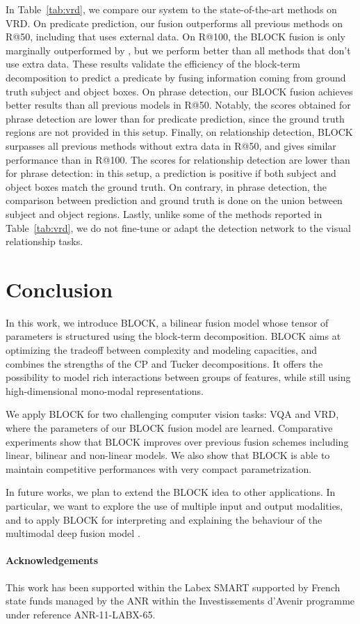 \documentclass[letterpaper]{article} \usepackage{aaai19}  \usepackage{times}  \usepackage{helvet}  \usepackage{courier}  \usepackage{url}  \usepackage{graphicx}  \usepackage{booktabs}       \usepackage{comment}
\begin{document}
In Table~\ref{tab:vrd}, we compare our system to the state-of-the-art methods on VRD. 
On predicate prediction, our fusion outperforms all previous methods on R@50, including \cite{Yu_2017_ICCV} that uses external data. On R@100, the BLOCK fusion is only marginally outperformed by \cite{Yu_2017_ICCV}, but we perform better than all methods that don't use extra data. These results validate the efficiency of the block-term decomposition to predict a predicate by fusing information coming from ground truth subject and object boxes.
On phrase detection, our BLOCK fusion achieves better results than all previous models in R@50. 
Notably, the scores obtained for phrase detection are lower than for predicate prediction, since the ground truth regions are not provided in this setup.
Finally, on relationship detection, BLOCK surpasses all previous methods without extra data in R@50, and gives similar performance than \cite{dai2017detecting} in R@100. The scores for relationship detection are lower than for phrase detection: in this setup, a prediction is positive if both subject and object boxes match the ground truth. On contrary, in phrase detection, the comparison between prediction and ground truth is done on the union between subject and object regions. 
Lastly, unlike some of the methods reported in Table~\ref{tab:vrd}, we do not fine-tune or adapt the detection network to the visual relationship tasks.

\section{Conclusion}
In this work, we introduce BLOCK, a bilinear fusion model whose tensor of parameters is structured using the block-term decomposition. BLOCK aims at optimizing the tradeoff between complexity and modeling capacities, and combines the strengths of the CP and Tucker decompositions. It offers the possibility to model rich interactions between groups of features, while still using high-dimensional mono-modal representations.

We apply BLOCK for two challenging computer vision tasks: VQA and VRD, where the parameters of our BLOCK fusion model are learned. Comparative experiments 
show that BLOCK improves over previous fusion schemes including linear, bilinear and non-linear models. We also show that BLOCK is able to maintain competitive performances with very compact parametrization. 

In future works, we plan to extend the BLOCK idea to other applications. In particular, we want to explore the use of multiple input and output modalities, and to apply BLOCK for interpreting and explaining the behaviour of the multimodal deep fusion model \cite{burger18,sigir18}.

\paragraph{Acknowledgements}
This work has been supported within the Labex SMART supported by French state funds managed by the ANR within the Investissements d’Avenir programme under reference ANR-11-LABX-65.



\end{document}
